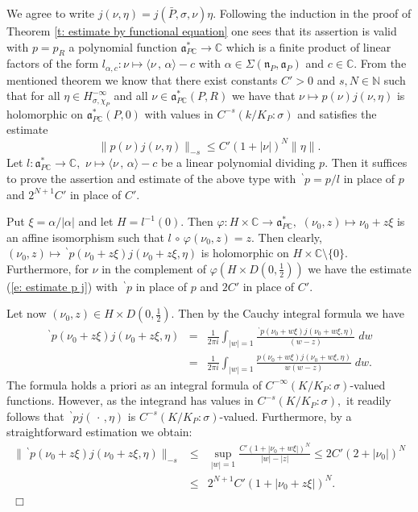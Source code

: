 \documentclass[12pt,a4paper]{article}
\def\proof{\par\noindent{\it Proof.}{\ }{\ }}
\def\qed{~\hfill\hbox{$\Box$}\medbreak}
\def\msy#1{{\mathbb #1}}
\def\C{{\msy C}}
\def\N{{\msy N}}
\def\ga{\alpha}
\def\gf{\varphi}
\def\gs{\sigma}
\def\gS{\Sigma}
\def\got#1{\mathfrak #1}
\def\fa{{\got a}}
\def\fn{{\got n}}
\def\to{\rightarrow}
\def\inp#1#2{\langle#1\,,\,#2\rangle}
\def\after{\,{\scriptstyle\circ}\,}
\def\iC{{\scriptscriptstyle \C}}
\numberwithin{Thm}{section}
\numberwithin{equation}{section}
\def\dotvar{\, \cdot\,}
\def\faPdc{{\fa_{P\iC}^*}}
\numberwithin{equation}{section}
\def\bp{\!{\,}^\backprime}
\def\faPdc{\fa_{P\iC}^*}
\def\faP{\fa_P}
\def\cchi{\chi}
\def\gsP{\gs}%
\begin{document}
\proof 
We agree to write $j(\nu, \eta) = j(\bar P, \gs, \nu)\eta$. 
Following the induction in the proof of Theorem \ref{t: estimate by functional equation} one
sees that its assertion is valid with $p = p_R$ a polynomial function $\faPdc \to \C$ which is 
a finite product of linear factors of the form $l_{\ga, c}: \nu \mapsto \inp{\nu}{\ga} - c$ 
with $\ga \in \gS(\fn_P, \faP)$ and $c \in \C.$ From the mentioned theorem we know that there
exist constants $C' > 0$ and $s, N \in \N$ such that for all $\eta\in H_{\gs,\cchi_P}^{-\infty}$ 
and all $\nu \in \faPdc(P,R)$ we have that $\nu \mapsto p(\nu) j(\nu, \eta)$ 
is holomorphic on $\faPdc(P,0)$ with values in $C^{-s}(k/K_P: \gsP)$ and satisfies the estimate
\begin{equation}
\label{e: estimate p j}
\|p(\nu) j(\nu, \eta)\|_{-s} \leq  C' (1 +|\nu|)^{N} \|\eta\|.
\end{equation}
Let $l: \faPdc \to \C,$ $\nu \mapsto \inp{\nu}{\ga} - c$ be a linear polynomial dividing $p.$ Then 
 it suffices to prove the assertion and estimate of the above
type with $\bp p  = p/l$ in place of $p$ and $2^{N+1} C'$ in place of $C'.$ 

%
Put $\xi  =\ga/|\ga|$ and let $H = l^{-1}(0).$ Then $\gf: H\times \C \to \faPdc,$ $(\nu_0, z) \mapsto 
\nu_0 + z \xi$ is an affine isomorphism such that $l\after \gf(\nu_0, z) = z.$ 
Then clearly,  
$(\nu_0, z) \mapsto \bp p(\nu_0 + z\xi)  j(\nu_0 + z \xi, \eta)$ 
is holomorphic on $H \times \C\setminus\{0\}.$ Furthermore, for $\nu$ in the complement 
of $\gf(H \times D(0,\frac12))$ we have the estimate (\ref{e: estimate p j}) with $\bp p$ in place of $p$ and 
$2 C'$ in place of $C'.$ 

Let now $(\nu_0 , z) \in H \times D(0,\frac12).$ Then by the Cauchy integral formula  we have
\begin{eqnarray*}
\bp p (\nu_0 + z \xi) j(\nu_0 + z \xi , \eta) & = & \frac{1}{2\pi i} \int_{|w| = 1} 
\frac{\bp p (\nu_0 + w \xi) j(\nu_0 + w \xi , \eta)}{(w - z)}\; dw\\
&=& 
\frac{1}{2\pi i} \int_{|w| = 1} 
\frac{p (\nu_0 + w \xi) j(\nu_0 + w \xi , \eta)}{w(w - z)}\; dw.
\end{eqnarray*}
The formula holds a priori as an integral formula of $C^{-\infty}(K/K_P:\gsP)$-valued functions.
However, as the integrand has values in $C^{-s}(K/K_P:\gsP),$ it readily follows that
$\bp p j(\dotvar ,\eta)$ is $C^{-s}(K/K_P:\gsP)$-valued. Furthermore, by a straightforward  estimation
we obtain:
\begin{eqnarray*}
\|\bp p (\nu_0 + z \xi) j(\nu_0 + z \xi , \eta)\|_{-s}
& \leq & 
\sup_{|w| =1} \frac{C' (1 + |\nu_0 + w \xi|)^N}{|w|- |z|} \leq  2 C' (2 + |\nu_0|)^N \\
& \leq & 
2^{N+1} C' ( 1+ |\nu_0 + z\xi|)^N .
\end{eqnarray*}
\qed
\end{document}
